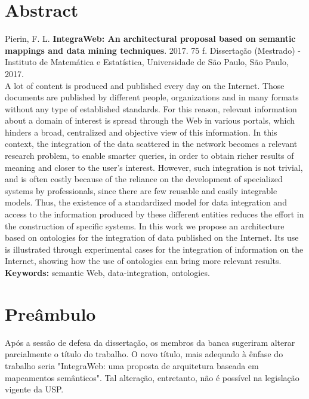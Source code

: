 \documentclass[11pt,twoside,a4paper]{book}
\begin{document}
\chapter*{Abstract}

\noindent Pierin, F. L. \textbf{IntegraWeb: An architectural proposal based on semantic mappings and data mining techniques}. 
2017. 75 f.
Dissertação (Mestrado) - Instituto de Matemática e Estatística,
Universidade de São Paulo, São Paulo, 2017.
\\


A lot of content is produced and published every day on the
Internet. Those documents are published by different people,
organizations and in many formats without any type of established
standards. For this reason, relevant information about a domain of
interest is spread through the Web in various portals, which hinders a broad, centralized and objective view of this information. In this context, the integration of the data scattered in the network becomes
a relevant research problem, to enable smarter queries, in order to
obtain richer results of meaning and closer to the user's
interest. However, such integration is not trivial, and is often
costly because of the reliance on the development of specialized
systems by professionals, since there are few reusable and easily
integrable models. Thus, the existence of a standardized model for
data integration and access to the information produced by these
different entities reduces the effort in the construction of specific
systems. In this work we propose an architecture based on ontologies for the integration of data published on the Internet. Its use is illustrated through experimental cases for the integration of information on the Internet, showing how the use of ontologies can bring more relevant results.
\\

\noindent \textbf{Keywords:} semantic Web, data-integration, ontologies.

\chapter*{Preâmbulo}

Após a sessão de defesa da dissertação, os membros da banca sugeriram alterar parcialmente o título do trabalho. O novo título, mais adequado à ênfase do trabalho seria "IntegraWeb: uma proposta de arquitetura baseada em
mapeamentos semânticos". Tal alteração, entretanto, não é possível na legislação vigente da USP.
\end{document}
